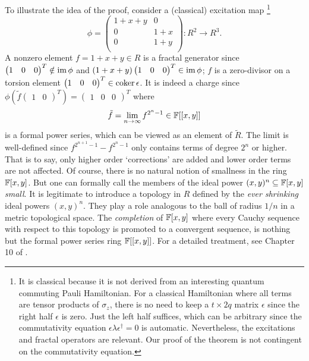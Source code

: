 To illustrate the idea of the proof,
consider a (classical) excitation map%
\footnote{
It is classical because it is not derived from an interesting quantum commuting Pauli Hamiltonian.
For a classical Hamiltonian where all terms are tensor products of $\sigma_z$,
there is no need to keep a $t \times 2q$ matrix $\epsilon$
since the right half $\epsilon$ is zero.
Just the left half suffices, which can be arbitrary
since the commutativity equation $\epsilon \lambda \epsilon^\dagger =0$ is automatic.
Nevertheless, the excitations and fractal operators are relevant.
Our proof of the theorem is not contingent on the commutativity equation.
}
\[
 \phi =
 \begin{pmatrix}
  1+x+y & 0   \\
     0  & 1+x \\
     0  & 1+y \\
 \end{pmatrix}
 : R^2 \to R^3 .
\]
A nonzero element $f=1+x+y \in R$ is a fractal generator
since $\begin{pmatrix} 1 & 0 & 0 \end{pmatrix}^T \notin \mathop{\mathrm{im}}\nolimits \phi$ 
and $(1+x+y)\begin{pmatrix} 1 & 0 & 0 \end{pmatrix}^T \in \mathop{\mathrm{im}}\nolimits \phi$;
$f$ is a zero-divisor on a torsion element $\begin{pmatrix} 1 & 0 & 0 \end{pmatrix}^T \in \mathop{\mathrm{coker}}\nolimits \epsilon$.
It is indeed a charge since 
$\phi(\tilde f \begin{pmatrix} 1 & 0 \end{pmatrix}^T) = \begin{pmatrix} 1 & 0 & 0 \end{pmatrix}^T$ where
\[
 \tilde f = \lim_{n \to \infty} f^{2^n-1} \in \mathbb{F}[[x,y]]
\]
is a formal power series, which can be viewed as an element of $\tilde R$.
The limit is well-defined since $f^{2^{n+1}-1} - f^{2^n -1}$ only contains terms of degree $2^n$ or higher.
That is to say, only higher order `corrections' are added and lower order terms are not affected.
Of course, there is no natural notion of smallness in the ring $\mathbb{F}[x,y]$.
But one can formally call the members of the ideal power $(x,y)^n \subseteq \mathbb{F}[x,y]$ \emph{small}.
It is legitimate to introduce a topology in $R$ defined by the \emph{ever shrinking} ideal powers $(x,y)^n$.
They play a role analogous to the ball of radius $1/n$ in a metric topological space.
The \emph{completion} of $\mathbb{F}[x,y]$
where every Cauchy sequence with respect to this topology is promoted to a convergent sequence,
is nothing but the formal power series ring $\mathbb{F}[[x,y]]$.
For a detailed treatment, see Chapter 10 of \cite{AtiyahMacDonald}.

